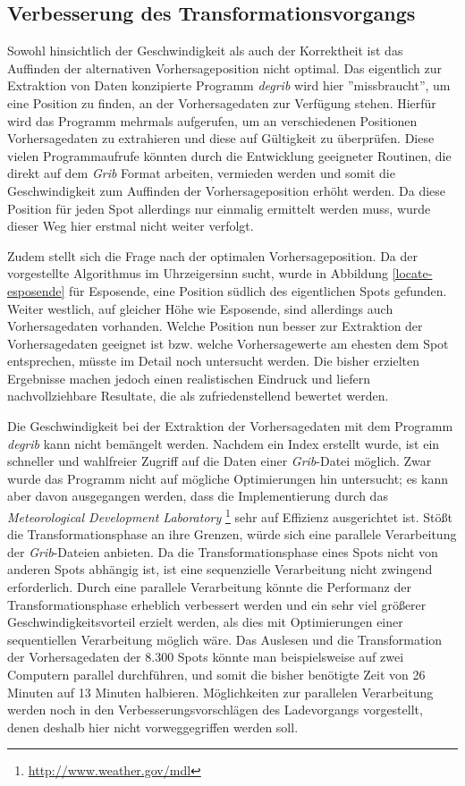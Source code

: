 \subsection{Verbesserung des Transformationsvorgangs}
Sowohl hinsichtlich der Geschwindigkeit als auch der Korrektheit ist
das Auffinden der alternativen Vorhersageposition nicht optimal. Das
eigentlich zur Extraktion von Daten konzipierte Programm
\textit{degrib} wird hier ''missbraucht'', um eine Position zu finden,
an der Vorhersagedaten zur Verfügung stehen. Hierfür wird das Programm
mehrmals aufgerufen, um an verschiedenen Positionen Vorhersagedaten zu
extrahieren und diese auf Gültigkeit zu überprüfen. Diese vielen
Programmaufrufe könnten durch die Entwicklung geeigneter Routinen, die
direkt auf dem \textit{Grib} Format arbeiten, vermieden werden und
somit die Geschwindigkeit zum Auffinden der Vorhersageposition erhöht
werden. Da diese Position für jeden Spot allerdings nur einmalig
ermittelt werden muss, wurde dieser Weg hier erstmal nicht weiter
verfolgt.

Zudem stellt sich die Frage nach der optimalen Vorhersageposition. Da
der vorgestellte Algorithmus im Uhrzeigersinn sucht, wurde in
Abbildung \ref{locate-esposende} für Esposende, eine Position südlich
des eigentlichen Spots gefunden. Weiter westlich, auf gleicher Höhe
wie Esposende, sind allerdings auch Vorhersagedaten vorhanden. Welche
Position nun besser zur Extraktion der Vorhersagedaten geeignet ist
bzw. welche Vorhersagewerte am ehesten dem Spot entsprechen, müsste im
Detail noch untersucht werden. Die bisher erzielten Ergebnisse machen
jedoch einen realistischen Eindruck und liefern nachvollziehbare
Resultate, die als zufriedenstellend bewertet werden.

Die Geschwindigkeit bei der Extraktion der Vorhersagedaten mit dem
Programm \textit{degrib} kann nicht bemängelt werden. Nachdem ein
Index erstellt wurde, ist ein schneller und wahlfreier Zugriff auf die
Daten einer \textit{Grib}-Datei möglich. Zwar wurde das Programm nicht
auf mögliche Optimierungen hin untersucht; es kann aber davon
ausgegangen werden, dass die Implementierung durch das
\textit{Meteorological Development Laboratory}
\footnote{\url{http://www.weather.gov/mdl}} sehr auf Effizienz
ausgerichtet ist. Stößt die Transformationsphase an ihre Grenzen,
würde sich eine parallele Verarbeitung der \textit{Grib}-Dateien
anbieten. Da die Transformationsphase eines Spots nicht von anderen
Spots abhängig ist, ist eine sequenzielle Verarbeitung nicht zwingend
erforderlich. Durch eine parallele Verarbeitung könnte die Performanz
der Transformationsphase erheblich verbessert werden und ein sehr viel
größerer Geschwindigkeitsvorteil erzielt werden, als dies mit
Optimierungen einer sequentiellen Verarbeitung möglich wäre. Das
Auslesen und die Transformation der Vorhersagedaten der 8.300 Spots
könnte man beispielsweise auf zwei Computern parallel durchführen, und
somit die bisher benötigte Zeit von 26 Minuten auf 13 Minuten
halbieren. Möglichkeiten zur parallelen Verarbeitung werden noch in
den Verbesserungsvorschlägen des Ladevorgangs vorgestellt, denen
deshalb hier nicht vorweggegriffen werden soll.

